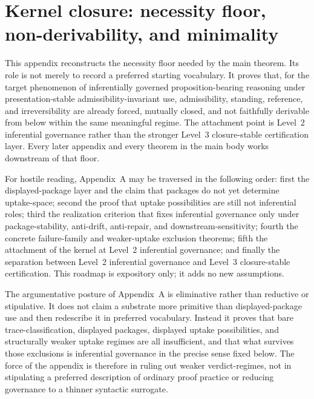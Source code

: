 \section{Kernel closure: necessity floor, non-derivability, and minimality}
\label{app:kernel}

This appendix reconstructs the necessity floor needed by the main theorem. Its role is not merely to record a preferred starting vocabulary. It proves that, for the target phenomenon of inferentially governed proposition-bearing reasoning under presentation-stable admissibility-invariant use, admissibility, standing, reference, and irreversibility are already forced, mutually closed, and not faithfully derivable from below within the same meaningful regime. The attachment point is Level~2 inferential governance rather than the stronger Level~3 closure-stable certification layer. Every later appendix and every theorem in the main body works downstream of that floor.

For hostile reading, Appendix~A may be traversed in the following order: first the displayed-package layer and the claim that packages do not yet determine uptake-space; second the proof that uptake possibilities are still not inferential roles; third the realization criterion that fixes inferential governance only under package-stability, anti-drift, anti-repair, and downstream-sensitivity; fourth the concrete failure-family and weaker-uptake exclusion theorems; fifth the attachment of the kernel at Level~2 inferential governance; and finally the separation between Level~2 inferential governance and Level~3 closure-stable certification. This roadmap is expository only; it adds no new assumptions.

The argumentative posture of Appendix~A is eliminative rather than reductive or stipulative. It does not claim a substrate more primitive than displayed-package use and then redescribe it in preferred vocabulary. Instead it proves that bare trace-classification, displayed packages, displayed uptake possibilities, and structurally weaker uptake regimes are all insufficient, and that what survives those exclusions is inferential governance in the precise sense fixed below. The force of the appendix is therefore in ruling out weaker verdict-regimes, not in stipulating a preferred description of ordinary proof practice or reducing governance to a thinner syntactic surrogate.


